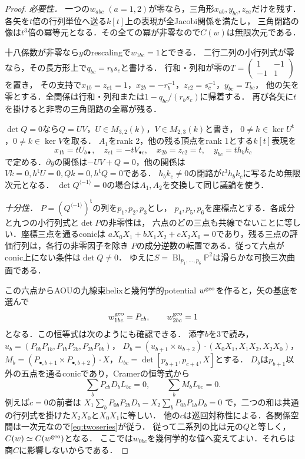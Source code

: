 \begin{proof}
\emph{必要性．}
一つの$w_{abc}$ $(a=1,2)$が零なら，三角形$x_{ab},y_{bc},z_{ca}$だけを残す．
各矢を$t$倍の行列単位へ送る$k[t]$上の表現が全Jacobi関係を満たし，
三角閉路の像は$t^3$倍の冪等元となる．その全ての冪が非零なので$C(w)$は無限次元である．

十八係数が非零なら$y$のrescalingで$w_{1bc}=1$とできる．
二行二列の小行列式が零なら，その長方形上で$q_{bc}=r_bs_c$と書ける．
行和・列和が零の$T=\left(\begin{smallmatrix}1&-1\\-1&1\end{smallmatrix}\right)$を置き，
その支持で$x_{1b}=z_{c1}=1$，$x_{2b}=-r_b^{-1}$，$z_{c2}=s_c^{-1}$，$y_{bc}=T_{bc}$，
他の矢を零とする．全関係は行和・列和または$1-q_{bc}/(r_bs_c)$に帰着する．
再び各矢に$t$を掛けると非零の三角閉路の全冪が残る．

$\det Q=0$なら$Q=UV$，$U\in M_{3,2}(k)$，$V\in M_{2,3}(k)$と書き，
$0\ne h\in\ker U^{\mathsf t}$，$0\ne k\in\ker V$を取る．
$A_1$をrank 2，他の残る頂点をrank 1とする$k[t]$表現を
\[
 x_{1b}=tU_{b\bullet},\quad z_{c1}=-tV_{\bullet c},\quad
 x_{2b}=z_{c2}=t,\quad y_{bc}=th_bk_c
\]
で定める．$\partial y$の関係は$-UV+Q=0$，他の関係は
$Vk=0,h^{\mathsf t}U=0,Qk=0,h^{\mathsf t}Q=0$である．
$h_bk_c\ne0$の閉路が$t^3h_bk_c$に写るため無限次元となる．
$\det Q^{\langle-1\rangle}=0$の場合は$A_1,A_2$を交換して同じ議論を使う．

\emph{十分性．}
$P=(Q^{\langle-1\rangle})^{\mathsf t}$の列を$p_1,p_2,p_3$とし，
$p_4,p_5,p_6$を座標点とする．各成分と九つの小行列式と$\det P$の非零性は，
六点のどの三点も共線でないことに等しい．座標三点を通るconicは
$aX_0X_1+bX_1X_2+cX_2X_0=0$であり，残る三点の評価行列は，各行の非零因子を除き
$P$の成分逆数の転置である．従って六点がconic上にない条件は$\det Q\ne0$．
ゆえに$S=\operatorname{Bl}_{p_1,\ldots,p_6}\mathbb P^2$は滑らかな可換三次曲面である．

この六点からAOUの九線束helixと幾何学的potential $w^{\rm geo}$を作ると，矢の基底を選んで
\begin{equation}\label{eq:twoseries}
 w^{\rm geo}_{1bc}=P_{cb},\qquad w^{\rm geo}_{2bc}=1
\end{equation}
となる\cite[(8.4)--(8.7)]{AOU}．この恒等式は次のようにも確認できる．
添字$b$を3で読み，$u_b=(P_{0b}P_{1b},P_{1b}P_{2b},P_{2b}P_{0b})$，
$D_b=(u_{b+1}\times u_{b+2})\cdot(X_0X_1,X_1X_2,X_2X_0)$，
$M_b=(P_{\bullet,b+1}\times P_{\bullet,b+2})\cdot X$，$L_{bc}=\det[p_{b+1},p_{c+4},X]$とする．
$D_b$は$p_{b+1}$以外の五点を通るconicであり，Cramerの恒等式から
\[
 \sum_bP_{cb}D_bL_{bc}=0,\qquad \sum_bM_bL_{bc}=0.
\]
例えば$c=0$の前者は
$X_1\sum_bP_{0b}P_{2b}D_b-X_2\sum_bP_{0b}P_{1b}D_b=0$
で，二つの和は共通の行列式を掛けた$X_2X_0$と$X_0X_1$に等しい．
他の$c$は巡回対称性による．各関係空間は一次元なので\eqref{eq:twoseries}が従う．
従って二系列の比は元の$Q$と等しく，$C(w)\simeq C(w^{\rm geo})$となる．
ここでは$w_{0bc}$を幾何学的な値へ変えてよい．それらは商$C$に影響しないからである．


\end{proof}
